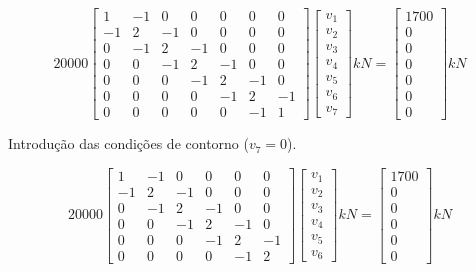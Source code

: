 \documentclass{article} %
\begin{document}
\begin{equation*}
20000\begin{bmatrix}
1& -1& 0& 0& 0& 0& 0\\
-1& 2& -1& 0& 0& 0& 0\\
0&-1& 2& -1& 0& 0& 0\\
0&0&-1&2& -1& 0& 0\\
0&0&0&-1& 2& -1& 0\\
0&0&0&0&-1&2& -1\\
0&0&0&0&0& -1& 1
\end{bmatrix} \begin{bmatrix}
v_1\\
v_2\\
v_3\\
v_4\\
v_5\\
v_6\\
v_7
\end{bmatrix}kN=\begin{bmatrix}
1700\\
0\\
0\\
0\\
0\\
0\\
0
\end{bmatrix}kN
\end{equation*}

Introdução das condições de contorno (\(v_7=0\)).

\begin{equation*}
20000\begin{bmatrix}
1& -1& 0& 0& 0& 0\\
-1& 2& -1& 0& 0& 0\\
0&-1& 2& -1& 0& 0\\
0&0&-1&2& -1& 0\\
0&0&0&-1& 2& -1\\
0&0&0&0&-1&2
\end{bmatrix}\begin{bmatrix}
v_1\\
v_2\\
v_3\\
v_4\\
v_5\\
v_6
\end{bmatrix}kN=\begin{bmatrix}
1700\\
0\\
0\\
0\\
0\\
0
\end{bmatrix}kN
\end{equation*}
\end{document}
